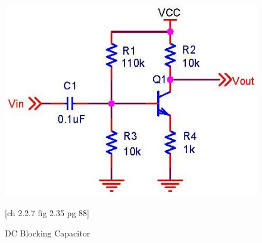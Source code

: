 \begin{figure}[ht!]
\includegraphics[keepaspectratio=true,scale=.5]{./figures/parameters/dcBlocking.jpg}
\centering
\caption{DC Blocking Capacitor}
\cite{hh}[ch 2.2.7 fig 2.35 pg 88]
\label{fig:dcBlock}
\end{figure}
